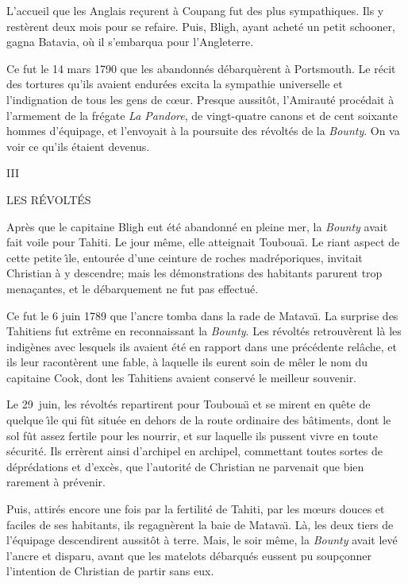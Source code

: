 L'accueil que les Anglais re\c{c}urent \`a Coupang
fut des plus sympathiques. Ils y rest\`erent deux mois
pour se refaire. Puis, Bligh, ayant achet\'e un petit schooner,
gagna Batavia, o\`u il s'embarqua pour l'Angleterre.

Ce fut le 14 mars 1790 que les abandonn\'es d\'ebarqu\`erent
\`a Ports\-mouth. Le r\'ecit des tortures qu'ils avaient
endur\'ees excita la sympathie universelle et l'indignation
de tous les gens de c{\oe}ur. Presque aussit\^ot, l'Amiraut\'e
proc\'edait \`a l'armement de la fr\'egate {\sl La Pandore},
de vingt-quatre canons et de cent soixante hommes
d'\'equipage, et l'envoyait \`a la poursuite
des r\'evolt\'es de la {\sl Bounty}.
On va voir ce qu'ils \'etaient devenus.

\vfill\eject


\topglue 5pc
\centerline{\sf III}
\bigskip
\centerline{\sf LES R\'EVOLT\'ES}
\vskip 2pc
\noindent
Apr\`es que le capitaine Bligh eut \'et\'e abandonn\'e en
pleine mer, la {\sl Bounty\/} avait fait voile pour Tahiti.
Le jour m\^eme, elle atteignait Touboua\"\i. Le riant aspect
de cette petite {\^\i}le, entour\'ee d'une ceinture
de roches madr\'eporiques, invitait Christian \`a y descendre;
mais les d\'emonstrations des habitants parurent trop
mena\c{c}antes, et le d\'ebarquement ne fut pas effectu\'e.

Ce fut le 6 juin 1789 que l'ancre tomba dans la rade
de Matava\"\i. La surprise des Tahitiens fut extr\^eme
en reconnaissant la {\sl Bounty}. Les r\'evolt\'es
retrouv\`erent l\`a les indig\`enes avec lesquels ils
avaient \'et\'e en rapport dans une pr\'ec\'edente
rel\^ache, et ils leur racont\`erent une fable,
\`a laquelle ils eurent soin de m\^eler le nom du
capitaine Cook, dont les Tahitiens avaient conserv\'e
le meilleur souvenir.

Le 29~juin, les r\'evolt\'es repartirent pour
Touboua{\"\i} et se mirent en qu\^ete de quelque
{\^\i}le qui f\^ut situ\'ee en dehors de la route
ordinaire des b\^atiments, dont le sol f\^ut assez
fertile pour les nourrir, et sur laquelle ils pussent vivre
en toute s\'ecurit\'e.
Ils err\`erent ainsi d'archipel en archipel,
commettant toutes sortes de d\'epr\'edations
et d'exc\`es, que l'autorit\'e de Christian
ne parvenait que bien rarement \`a pr\'evenir.

Puis, attir\'es encore une fois par la fertilit\'e
de Tahiti, par les m{\oe}urs douces et faciles de ses
habitants, ils regagn\`erent la baie de Matava\"\i.
L\`a, les deux tiers de l'\'equipage descendirent
aussit\^ot \`a terre. Mais, le soir m\^eme,
la {\sl Bounty\/} avait lev\'e l'ancre et disparu,
avant que les matelots d\'ebarqu\'es eussent pu
soup\c{c}onner l'intention de Christian de partir sans eux.

